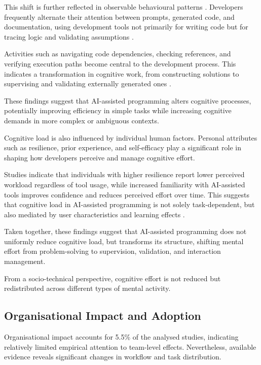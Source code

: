 \documentclass[conference]{IEEEtran}
\begin{document}
This shift is further reflected in observable behavioural patterns \cite{pinto_developer_2024, zhong_developer-llm_2025}. Developers frequently alternate their attention between prompts, generated code, and documentation, using development tools not primarily for writing code but for tracing logic and validating assumptions \cite{gardella_performance_2024}.

Activities such as navigating code dependencies, checking references, and verifying execution paths become central to the development process. This indicates a transformation in cognitive work, from constructing solutions to supervising and validating externally generated ones \cite{tang_study_2024}.

These findings suggest that AI-assisted programming alters cognitive processes, potentially improving efficiency in simple tasks while increasing cognitive demands in more complex or ambiguous contexts.

Cognitive load is also influenced by individual human factors. Personal attributes such as resilience, prior experience, and self-efficacy play a significant role in shaping how developers perceive and manage cognitive effort.

Studies indicate that individuals with higher resilience report lower perceived workload regardless of tool usage, while increased familiarity with AI-assisted tools improves confidence and reduces perceived effort over time. This suggests that cognitive load in AI-assisted programming is not solely task-dependent, but also mediated by user characteristics and learning effects \cite{gardella_performance_2024}.

Taken together, these findings suggest that AI-assisted programming does not uniformly reduce cognitive load, but transforms its structure, shifting mental effort from problem-solving to supervision, validation, and interaction management.

From a socio-technical perspective, cognitive effort is not reduced but redistributed across different types of mental activity.

\subsection{Organisational Impact and Adoption}

Organisational impact accounts for 5.5\% of the analysed studies, indicating relatively limited empirical attention to team-level effects. Nevertheless, available evidence reveals significant changes in workflow and task distribution.
\end{document}
